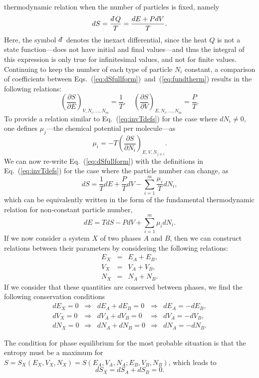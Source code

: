 \documentclass[11pt,a4paper,twoside]{carrollthesis}
\newcommand{\be}{\begin{equation}}
\newcommand{\ee}{\end{equation}}
\newcommand{\del}{\partial}
\newcommand{\bea}{\begin{eqnarray}}
\newcommand{\eea}{\end{eqnarray}}
\newcommand{\reci}[1]{\frac{1}{#1}}
\newcommand{\dbar}{d\mkern-6mu\mathchar'26}
\newcommand{\emdash}{\hspace{1pt}---\hspace{1pt}}
\begin{document}
thermodynamic relation when the number of particles is fixed, namely
%
\be \label{eq:fundtherm} dS = \frac{\dbar Q}{T} = \frac{dE + PdV}{T}.
\ee
%
Here, the symbol $\dbar$ denotes the inexact differential, since the
heat $Q$ is not a state function\emdash does not have initial and
final values\emdash and thus the integral of this expression is only
true for infinitesimal values, and not for finite values.
%
Continuing to keep the number of each type of particle $N_i$ constant,
a comparison of coefficients between
Eqs.~(\ref{eq:dSfullform})~and~(\ref{eq:fundtherm}) results in the
following relations:
%
\be \label{eq:invTdefs} \left(\frac{\del S}{\del
  E}\right)_{V,N_i,\ldots,N_m} = \reci{T}, \quad \left(\frac{\del
  S}{\del V}\right)_{E,N_i,\ldots,N_m} = \frac{P}{T}.  \ee
%
To provide a relation similar to Eq.~(\ref{eq:invTdefs}) for the case
where $dN_i \neq 0$, one defines $\mu_j$\emdash the chemical potential
per molecule\emdash as
%
\be \mu_i = -T\left(\frac{\del S}{\del N_i}\right)_{E,V,N_{j\neq i}}.
\ee
%
We can now re-write Eq.~(\ref{eq:dSfullform}) with the definitions in
Eq.~(\ref{eq:invTdefs}) for the case where the particle number can
change, as
%
\be 
\label{eq:dS}
dS = \reci{T}dE + \frac{P}{T}dV - \sum_{i=1}^m \frac{\mu_i}{T}dN_i,
\ee
%
which can be equivalently written in the form of the fundamental
thermodynamic relation for non-constant particle number,
%
\be dE = TdS - PdV + \sum_{i=1}^m \mu_i dN_i.  \ee
%
If we now consider a system $X$ of two phases $A$ and $B$, then we can
construct relations between their parameters by considering the
following relations:
%
\bea
\nonumber
E_X &=& E_A + E_B, \\
V_X &=& V_A + V_B, \\
\nonumber
N_X &=& N_A + N_B.
\eea
%
If we consider that these quantities are conserved between phases, we
find the following conservation conditions
%
\be%
\label{eq:changesAB}
\begin{array}{rcrcr}
dE_X = 0 &\Rightarrow &dE_A + dE_B = 0 &\Rightarrow &dE_A = - dE_B, \\[2mm]
%
dV_X = 0 &\Rightarrow &dV_A + dV_B = 0 &\Rightarrow &dV_A = - dV_B,
\\[2mm]
%
dN_X = 0 &\Rightarrow &dN_A + dN_B = 0 &\Rightarrow &dN_A = - dN_B .
\end{array}
\ee%
%
\par
%
The condition for phase equilibrium for the most probable situation is
that the entropy must be a maximum for
$S=S_X(E_X,V_X,N_X)=S(E_A,V_A,N_A;E_B,V_B,N_B)$, which leads to
%
\be dS_X = dS_A + dS_B = 0.  \ee
\end{document}
